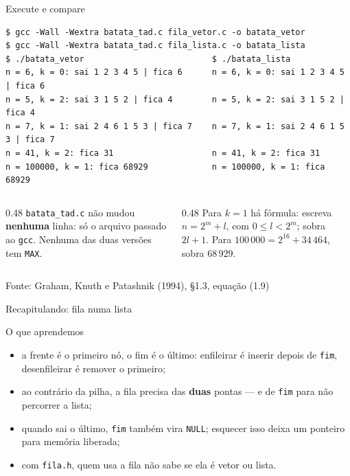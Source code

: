 \documentclass[aspectratio=169]{beamer}
\newcommand{\fonte}[1]{\vfill\hfill{\scriptsize\textcolor{UFSGray}{Fonte: #1}}}
\begin{document}
\begin{frame}[fragile]{Execute e compare}
\begin{lstlisting}[style=shellStyle]
$ gcc -Wall -Wextra batata_tad.c fila_vetor.c -o batata_vetor
$ gcc -Wall -Wextra batata_tad.c fila_lista.c -o batata_lista
$ ./batata_vetor                          $ ./batata_lista
n = 6, k = 0: sai 1 2 3 4 5 | fica 6      n = 6, k = 0: sai 1 2 3 4 5 | fica 6
n = 5, k = 2: sai 3 1 5 2 | fica 4        n = 5, k = 2: sai 3 1 5 2 | fica 4
n = 7, k = 1: sai 2 4 6 1 5 3 | fica 7    n = 7, k = 1: sai 2 4 6 1 5 3 | fica 7
n = 41, k = 2: fica 31                    n = 41, k = 2: fica 31
n = 100000, k = 1: fica 68929             n = 100000, k = 1: fica 68929
\end{lstlisting}
  \begin{columns}[T]
    \begin{column}{0.48\textwidth}
      \small \texttt{batata\_tad.c} não mudou \textbf{nenhuma} linha: só o
      arquivo passado ao \texttt{gcc}. Nenhuma das duas versões tem
      \texttt{MAX}.
    \end{column}
    \begin{column}{0.48\textwidth}
      \small Para $k = 1$ há fórmula: escreva $n = 2^m + l$, com
      $0 \le l < 2^m$; sobra $2l + 1$. Para $100\,000 = 2^{16} + 34\,464$,
      sobra $68\,929$.
    \end{column}
  \end{columns}
  \fonte{Graham, Knuth e Patashnik (1994), §1.3, equação (1.9)~\cite{graham1994concrete}}
\end{frame}

\begin{frame}{Recapitulando: fila numa lista}
  \begin{block}{O que aprendemos}
    \begin{itemize}
      \item a frente é o primeiro nó, o fim é o último: enfileirar é
        inserir depois de \texttt{fim}, desenfileirar é remover o primeiro;
      \item ao contrário da pilha, a fila precisa das \textbf{duas} pontas
        --- e de \texttt{fim} para não percorrer a lista;
      \item quando sai o último, \texttt{fim} também vira \texttt{NULL};
        esquecer isso deixa um ponteiro para memória liberada;
      \item com \texttt{fila.h}, quem usa a fila não sabe se ela é vetor ou
        lista.
    \end{itemize}
  \end{block}
\end{frame}
\end{document}

